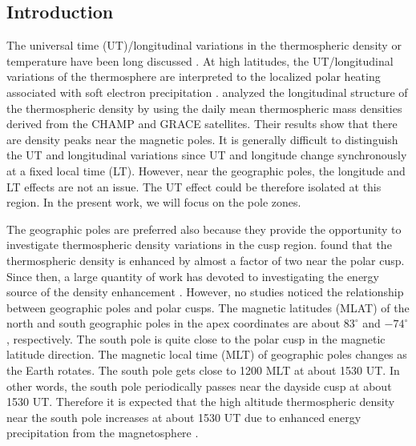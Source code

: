 \documentclass[draft,grl]{/home/gdj/文档/template/agu_template/AGUTeX}
\begin{document}
\begin{article}

\section{Introduction}
    The universal time (UT)/longitudinal variations in the thermospheric density or temperature have been long 
    discussed \citep[e.g.,][]{Hedin1972, Hedin1979, Hedin1985, Xu2013a, Xu2013}. 
    At high latitudes, the UT/longitudinal variations of the thermosphere are interpreted to the localized polar 
    heating associated with soft electron precipitation \citep{Hedin1972}. 
    \citet{Xu2013} analyzed the longitudinal structure of the thermospheric density by using the daily mean 
    thermospheric mass densities derived from the CHAMP and GRACE satellites. 
    Their results show that there are density peaks near the magnetic poles. 
    It is generally difficult to distinguish the UT and longitudinal variations since UT and longitude change 
    synchronously at a fixed local time (LT). 
    However, near the geographic poles, the longitude and LT effects are not an issue. 
    The UT effect could be therefore isolated at this region. 
    In the present work, we will focus on the pole zones.

    The geographic poles are preferred also because they provide the opportunity to investigate thermospheric 
    density variations in the cusp region. 
    \citet{Luhr2004} found that the thermospheric density is enhanced by almost a factor of two near the polar cusp. 
    Since then, a large quantity of work has devoted to investigating the energy source of the density enhancement 
    \citep[e.g.,][]{Deng2011, Knipp2011, Zhang2012, Deng2013, Zhang2015}.  
    However, no studies noticed the relationship between geographic poles and polar cusps. 
    The magnetic latitudes (MLAT) of the north and south geographic poles in the apex coordinates are about $83^{\circ}$ 
    and $-74^{\circ}$, respectively. 
    The south pole is quite close to the polar cusp in the magnetic latitude direction. 
    The magnetic local time (MLT) of geographic poles changes as the Earth rotates. 
    The south pole gets close to 1200 MLT at about 1530 UT. In other words, the south pole periodically passes near 
    the dayside cusp at about 1530 UT. 
    Therefore it is expected that the high altitude thermospheric density near the south pole increases at
    about 1530 UT due to enhanced energy precipitation from the magnetosphere \citep{Luhr2004}.


\end{article}
\end{document}
